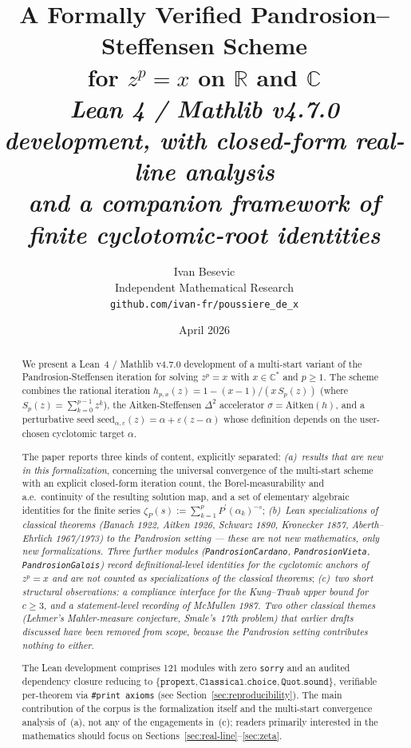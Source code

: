 \documentclass[11pt,a4paper]{article}
\title{A Formally Verified Pandrosion--Steffensen Scheme\\
for $z^p = x$ on $\mathbb{R}$ and $\mathbb{C}$\\[0.3cm]
\normalsize \textit{Lean 4 / Mathlib v4.7.0 development,
with closed-form real-line analysis\\
and a companion framework of finite cyclotomic-root identities}}
\author{Ivan Besevic\\
\small Independent Mathematical Research\\
\small \texttt{github.com/ivan-fr/poussiere\_de\_x}}
\date{April 2026}
\theoremstyle{definition}
\theoremstyle{remark}
\begin{document}
\maketitle

\begin{abstract}
We present a Lean~4 / Mathlib v4.7.0 development of a multi-start
variant of the Pandrosion-Steffensen iteration for solving
$z^p = x$ with $x \in \mathbb{C}^\ast$ and $p \geq 1$. The scheme
combines the rational iteration $h_{p,x}(z) = 1 - (x-1)/(x\,S_p(z))$
(where $S_p(z) = \sum_{k=0}^{p-1} z^k$), the Aitken-Steffensen $\Delta^2$
accelerator $\sigma = \mathrm{Aitken}(h)$, and a perturbative
seed $\mathrm{seed}_{\alpha,\varepsilon}(z) = \alpha + \varepsilon(z-\alpha)$
whose definition depends on the user-chosen cyclotomic target $\alpha$.

The paper reports three kinds of content, explicitly separated:
\emph{(a)~results that are new in this formalization}, concerning the
universal convergence of the multi-start scheme with an explicit
closed-form iteration count, the Borel-measurability and a.e.\ continuity
of the resulting solution map, and a set of elementary algebraic identities
for the finite series
$\zeta_P(s) := \sum_{k=1}^p P^{\prime}(\alpha_k)^{-s}$;
\emph{(b)~Lean specializations of classical theorems (Banach 1922,
Aitken 1926, Schwarz 1890, Kronecker 1857, Aberth--Ehrlich 1967/1973)
to the Pandrosion setting — these are not new mathematics, only new
formalizations. Three further modules
(\texttt{PandrosionCardano}, \texttt{PandrosionVieta},
\texttt{PandrosionGalois}) record definitional-level identities for the
cyclotomic anchors of $z^p = x$ and are not counted as specializations
of the classical theorems};
\emph{(c)~two short structural observations: a compliance interface
for the Kung--Traub upper bound for $c \geq 3$, and a statement-level
recording of McMullen 1987. Two other classical themes (Lehmer's
Mahler-measure conjecture, Smale's~17th problem) that earlier drafts
discussed have been removed from scope, because the Pandrosion setting
contributes nothing to either}.

The Lean development comprises 121 modules with zero \texttt{sorry} and
an audited dependency closure reducing to
$\{\texttt{propext}, \texttt{Classical.choice}, \texttt{Quot.sound}\}$,
verifiable per-theorem via \texttt{\#print axioms}
(see Section~\ref{sec:reproducibility}).
The main contribution of the corpus is the formalization itself and the
multi-start convergence analysis of~(a), not any of the engagements
in~(c); readers primarily interested in the mathematics should focus on
Sections~\ref{sec:real-line}--\ref{sec:zeta}.
\end{abstract}
\end{document}
